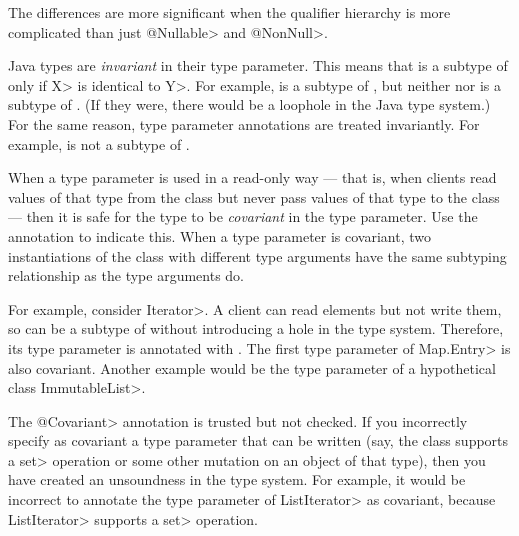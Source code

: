 The differences are more
significant when the qualifier hierarchy is more complicated than just
\<@Nullable> and \<@NonNull>.


Java types are \emph{invariant} in their type parameter.  This means that
 is a subtype of  only if \<X> is identical to \<Y>.  For
example,  is a subtype of , but
neither  nor  is a subtype of
.  (If they were, there would be a loophole in the Java
type system.)  For the same reason, type parameter annotations are treated
invariantly.  For example,  is not a subtype
of .

When a type parameter is used in a read-only way --- that is, when clients
read values of that type from the class but never pass values of that type
to the class --- then it is safe for the
type to be \emph{covariant} in the type parameter.  Use the
 annotation to indicate this.
When a type parameter is covariant, two instantiations of the class with
different type arguments have the same subtyping relationship as the type
arguments do.

For example, consider \<Iterator>.  A client can read elements but not
write them, so  can be a subtype of
 without introducing a hole in the type system.
Therefore, its type parameter is annotated with
.
The first type parameter of \<Map.Entry> is also covariant.
Another example would be the type parameter of a hypothetical class
\<ImmutableList>.

The \<@Covariant> annotation is trusted but not checked.
If you incorrectly specify as covariant a type parameter that can be
written (say, the class supports a
\<set> operation or some other mutation on an object of that type), then
you have created an unsoundness in the type system.
For example, it would be incorrect to annotate the type parameter of
\<ListIterator> as covariant, because \<ListIterator> supports a \<set>
operation.


